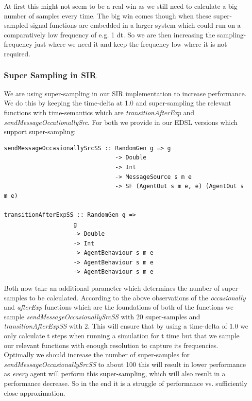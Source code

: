 At first this might not seem to be a real win as we still need to calculate a big number of samples every time. The big win comes though when these super-sampled signal-functions are embedded in a larger system which could run on a comparatively low frequency of e.g. 1 dt. So we are then increasing the sampling-frequency just where we need it and keep the frequency low where it is not required.

\subsubsection{Super Sampling in SIR}
We are using super-sampling in our SIR implementation to increase performance. We do this by keeping the time-delta at 1.0 and super-sampling the relevant functions with time-semantics which are \textit{transitionAfterExp} and \textit{sendMessageOccationallySrc}. For both we provide in our EDSL versions which support super-sampling:

\begin{verbatim}
sendMessageOccasionallySrcSS :: RandomGen g => g 
                                -> Double
                                -> Int
                                -> MessageSource s m e 
                                -> SF (AgentOut s m e, e) (AgentOut s m e)
                                
transitionAfterExpSS :: RandomGen g =>
                    g 
                    -> Double
                    -> Int
                    -> AgentBehaviour s m e
                    -> AgentBehaviour s m e
                    -> AgentBehaviour s m e
\end{verbatim}

Both now take an additional parameter which determines the number of super-samples to be calculated. According to the above observations of the \textit{occasionally} and \textit{afterExp} functions which are the foundations of both of the functions we sample \textit{sendMessageOccasionallySrcSS} with 20 super-samples and \textit{transitionAfterExpSS} with 2. This will ensure that by using a time-delta of 1.0 we only calculate t steps when running a simulation for t time but that we sample our relevant functions with enough resolution to capture its frequencies. Optimally we should increase the number of super-samples for \textit{sendMessageOccasionallySrcSS} to about 100 this will result in lower performance as \textit{every} agent will perform this super-sampling, which will also result in a performance decrease. So in the end it is a struggle of performance vs. sufficiently close approximation.